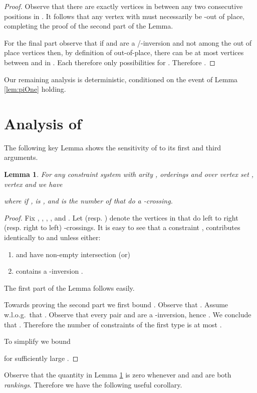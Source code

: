\documentclass[dvips,11pt,letter]{article}
\newtheorem{lemma}[theorem]{Lemma}
\begin{document}
{\begin{proof}
Observe that there are exactly  vertices in  between any two consecutive positions in . It follows that any vertex with  must necessarily be -out of place, completing the proof of the second part of the Lemma.

For the final part observe that if  and  are a /-inversion and not among the  out of place vertices then, by definition of out-of-place, there can be at most   vertices between  and  in . Each  therefore only  possibilities for . Therefore .
\end{proof}

Our remaining analysis is deterministic, conditioned on the event of Lemma \ref{lem:piOne} holding.

\section{Analysis of } \label{sec:sigmaTwo}

The following key Lemma shows the sensitivity of  to its first and third arguments.
\begin{lemma}\label{lem:bChangeFirst}
For any constraint system  with arity , orderings  and  over vertex set , vertex  and  we have

where  if ,  is , and  is the number of  that do a -crossing.
\end{lemma}
\begin{proof}
Fix , , , ,  and . Let  (resp. ) denote the vertices in  that do left to right (resp. right to left) -crossings. It is easy to see that a constraint ,  contributes identically to  and  unless either:
\begin{enumerate}
\item  and  have non-empty intersection (or)
\item  contains a -inversion .
\end{enumerate}
The first part of the Lemma follows easily.

Towards proving the second part we first bound . Observe that . Assume w.l.o.g.\ that . Observe that every pair  and  are a -inversion, hence
. We conclude that . Therefore the number of constraints of the first type is at most .

To simplify we bound

for sufficiently large .
\end{proof}

Observe that the quantity  in Lemma \ref{lem:bChangeFirst} is zero whenever  and  and  are both \emph{rankings}. Therefore we have the following useful corollary.

}
\end{document}
